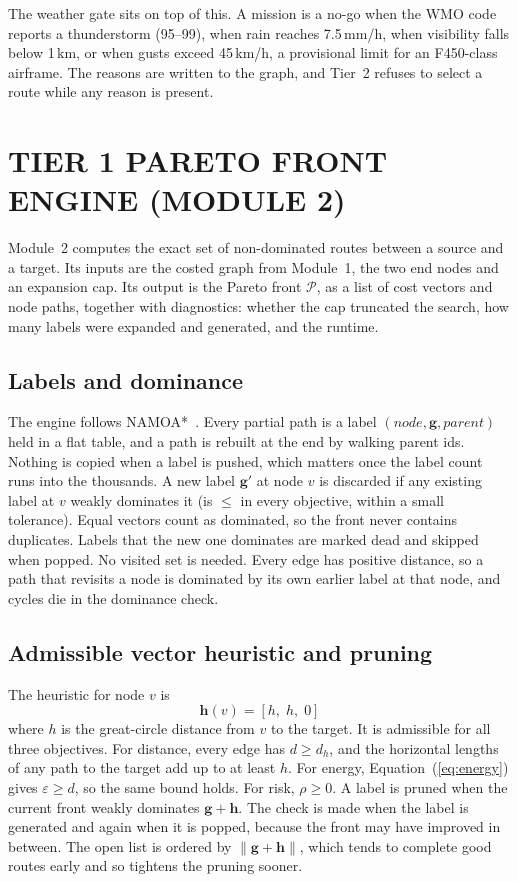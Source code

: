 The weather gate sits on top of this. A mission is a no-go when the WMO code reports a
thunderstorm (95--99), when rain reaches 7.5\,mm/h, when visibility falls below 1\,km,
or when gusts exceed 45\,km/h, a provisional limit for an F450-class airframe. The
reasons are written to the graph, and Tier~2 refuses to select a route while any reason
is present.

\section{TIER 1 PARETO FRONT ENGINE (MODULE 2)}\label{sec:m2}

Module~2 computes the exact set of non-dominated routes between a source and a target.
Its inputs are the costed graph from Module~1, the two end nodes and an expansion cap.
Its output is the Pareto front $\mathcal{P}$, as a list of cost vectors and node paths,
together with diagnostics: whether the cap truncated the search, how many labels were
expanded and generated, and the runtime.

\subsection{Labels and dominance}

The engine follows NAMOA*~\cite{r17}. Every partial path is a label
$(\mathit{node}, \mathbf{g}, \mathit{parent})$ held in a flat table, and a path is
rebuilt at the end by walking parent ids. Nothing is copied when a label is pushed,
which matters once the label count runs into the thousands. A new label $\mathbf{g}'$ at
node $v$ is discarded if any existing label at $v$ weakly dominates it (is $\leq$ in
every objective, within a small tolerance). Equal vectors count as dominated, so the
front never contains duplicates. Labels that the new one dominates are marked dead and
skipped when popped. No visited set is needed. Every edge has positive distance, so a
path that revisits a node is dominated by its own earlier label at that node, and cycles
die in the dominance check.

\subsection{Admissible vector heuristic and pruning}

The heuristic for node $v$ is
\begin{equation}
  \mathbf{h}(v) = [h,\; h,\; 0]
\end{equation}
where $h$ is the great-circle distance from $v$ to the target. It is admissible for all
three objectives. For distance, every edge has $d \geq d_h$, and the horizontal lengths
of any path to the target add up to at least $h$. For energy,
Equation~(\ref{eq:energy}) gives $\varepsilon \geq d$, so the same bound holds. For
risk, $\rho \geq 0$. A label is pruned when the current front weakly dominates
$\mathbf{g} + \mathbf{h}$. The check is made when the label is generated and again when
it is popped, because the front may have improved in between. The open list is ordered
by $\lVert\mathbf{g} + \mathbf{h}\rVert$, which tends to complete good routes early and
so tightens the pruning sooner.

